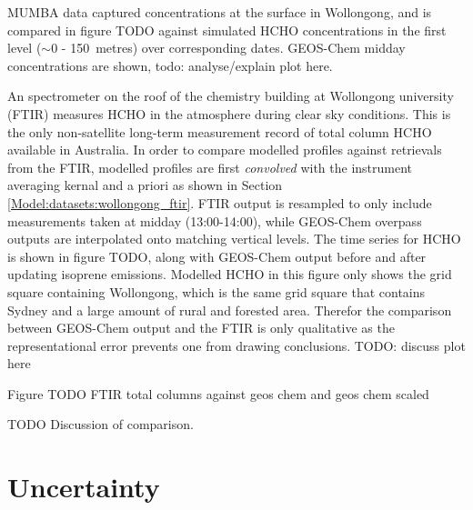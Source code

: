     
    
    MUMBA data captured concentrations at the surface in Wollongong, and is compared in figure TODO against simulated HCHO concentrations in the first level ($\sim$0 - 150~metres) over corresponding dates.
    GEOS-Chem midday concentrations are shown, todo: analyse/explain plot here.
    
    An spectrometer on the roof of the chemistry building at Wollongong university (FTIR) measures HCHO in the atmosphere during clear sky conditions.
    This is the only non-satellite long-term measurement record of total column HCHO available in Australia.
    In order to compare modelled profiles against retrievals from the FTIR, modelled profiles are first \textit{convolved} with the instrument averaging kernal and a priori as shown in Section \ref{Model:datasets:wollongong_ftir}.
    FTIR output is resampled to only include measurements taken at midday (13:00-14:00), while GEOS-Chem overpass outputs are interpolated onto matching vertical levels.
    The time series for HCHO is shown in figure TODO, along with GEOS-Chem output before and after updating isoprene emissions.
    Modelled HCHO in this figure only shows the grid square containing Wollongong, which is the same grid square that contains Sydney and a large amount of rural and forested area.
    Therefor the comparison between GEOS-Chem output and the FTIR is only qualitative as the representational error prevents one from drawing conclusions.
    TODO: discuss plot here
    
    
    Figure TODO FTIR total columns against geos chem and geos chem scaled
    
    
    TODO Discussion of comparison.
    
\section{Uncertainty}
\label{BioIsop:uncertainty}
  
  
